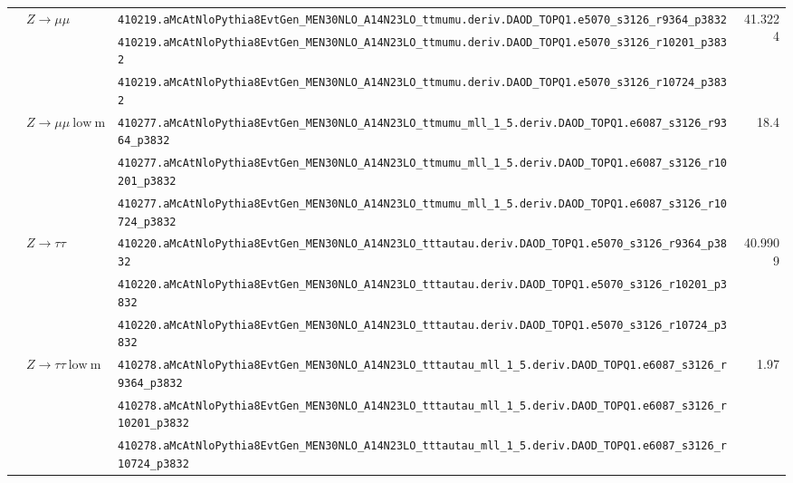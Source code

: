 \begin{table}[htbp]
{\begin{tabular}{ll|l|r}
                         & \multirow{3}{*}{$Z\to \mu\mu$}                  & \verb|410219.aMcAtNloPythia8EvtGen_MEN30NLO_A14N23LO_ttmumu.deriv.DAOD_TOPQ1.e5070_s3126_r9364_p3832|            & \multirow{3}{*}{41.3224} \\
                         &                                                 & \verb|410219.aMcAtNloPythia8EvtGen_MEN30NLO_A14N23LO_ttmumu.deriv.DAOD_TOPQ1.e5070_s3126_r10201_p3832|           & \\
                         &                                                 & \verb|410219.aMcAtNloPythia8EvtGen_MEN30NLO_A14N23LO_ttmumu.deriv.DAOD_TOPQ1.e5070_s3126_r10724_p3832|           & \\ \cline{2-4}

                         & \multirow{3}{*}{$Z\to \mu\mu\mathrm{~low~m}$}   & \verb|410277.aMcAtNloPythia8EvtGen_MEN30NLO_A14N23LO_ttmumu_mll_1_5.deriv.DAOD_TOPQ1.e6087_s3126_r9364_p3832|    & \multirow{3}{*}{18.4} \\
                         &                                                 & \verb|410277.aMcAtNloPythia8EvtGen_MEN30NLO_A14N23LO_ttmumu_mll_1_5.deriv.DAOD_TOPQ1.e6087_s3126_r10201_p3832|   & \\
                         &                                                 & \verb|410277.aMcAtNloPythia8EvtGen_MEN30NLO_A14N23LO_ttmumu_mll_1_5.deriv.DAOD_TOPQ1.e6087_s3126_r10724_p3832|   & \\ \cline{2-4}

                         & \multirow{3}{*}{$Z\to \tau\tau$}                & \verb|410220.aMcAtNloPythia8EvtGen_MEN30NLO_A14N23LO_tttautau.deriv.DAOD_TOPQ1.e5070_s3126_r9364_p3832|          & \multirow{3}{*}{40.9909} \\
                         &                                                 & \verb|410220.aMcAtNloPythia8EvtGen_MEN30NLO_A14N23LO_tttautau.deriv.DAOD_TOPQ1.e5070_s3126_r10201_p3832|         & \\
                         &                                                 & \verb|410220.aMcAtNloPythia8EvtGen_MEN30NLO_A14N23LO_tttautau.deriv.DAOD_TOPQ1.e5070_s3126_r10724_p3832|         & \\ \cline{2-4}

                         & \multirow{3}{*}{$Z\to \tau\tau\mathrm{~low~m}$} & \verb|410278.aMcAtNloPythia8EvtGen_MEN30NLO_A14N23LO_tttautau_mll_1_5.deriv.DAOD_TOPQ1.e6087_s3126_r9364_p3832|  & \multirow{3}{*}{1.97} \\
                         &                                                 & \verb|410278.aMcAtNloPythia8EvtGen_MEN30NLO_A14N23LO_tttautau_mll_1_5.deriv.DAOD_TOPQ1.e6087_s3126_r10201_p3832| & \\
                         &                                                 & \verb|410278.aMcAtNloPythia8EvtGen_MEN30NLO_A14N23LO_tttautau_mll_1_5.deriv.DAOD_TOPQ1.e6087_s3126_r10724_p3832| & \\ \cline{2-4}


\end{tabular}}
\end{table}
